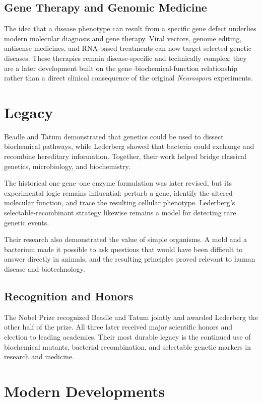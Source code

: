 \subsection{Gene Therapy and Genomic Medicine}

The idea that a disease phenotype can result from a specific gene defect underlies modern molecular diagnosis and gene therapy. Viral vectors, genome editing, antisense medicines, and RNA-based treatments can now target selected genetic diseases. These therapies remain disease-specific and technically complex; they are a later development built on the gene--biochemical-function relationship rather than a direct clinical consequence of the original \textit{Neurospora} experiments.

\section{Legacy}

Beadle and Tatum demonstrated that genetics could be used to dissect biochemical pathways, while Lederberg showed that bacteria could exchange and recombine hereditary information. Together, their work helped bridge classical genetics, microbiology, and biochemistry.

The historical one gene--one enzyme formulation was later revised, but its experimental logic remains influential: perturb a gene, identify the altered molecular function, and trace the resulting cellular phenotype. Lederberg's selectable-recombinant strategy likewise remains a model for detecting rare genetic events.

Their research also demonstrated the value of simple organisms. A mold and a bacterium made it possible to ask questions that would have been difficult to answer directly in animals, and the resulting principles proved relevant to human disease and biotechnology.

\subsection{Recognition and Honors}

The Nobel Prize recognized Beadle and Tatum jointly and awarded Lederberg the other half of the prize. All three later received major scientific honors and election to leading academies. Their most durable legacy is the continued use of biochemical mutants, bacterial recombination, and selectable genetic markers in research and medicine.

\section{Modern Developments}

